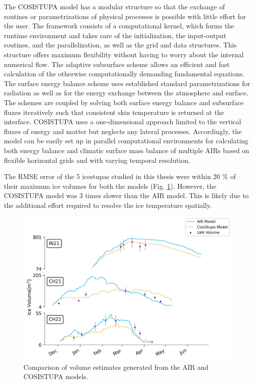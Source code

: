 The COSISTUPA model has a modular structure so that the exchange of routines or parametrizations of physical
processes is possible with little effort for the user. The framework consists of a computational kernel, which
forms the runtime environment and takes care of the initialization, the input-output routines, and the
parallelization, as well as the grid and data structures. This structure offers maximum flexibility without
having to worry about the internal numerical flow. The adaptive subsurface scheme allows an efficient and fast
calculation of the otherwise computationally demanding fundamental equations. The surface energy balance scheme
uses established standard parametrizations for radiation as well as for the energy exchange between the
atmosphere and surface. The schemes are coupled by solving both surface energy balance and subsurface fluxes
iteratively such that consistent skin temperature is returned at the interface. COSISTUPA uses a one-dimensional
approach limited to the vertical fluxes of energy and matter but neglects any lateral processes. Accordingly,
the model can be easily set up in parallel computational environments for calculating both energy balance and
climatic surface mass balance of multiple \ac{AIRs} based on flexible horizontal grids and with varying temporal
resolution.

The RMSE error of the 5 icestupas studied in this thesis were within 20 \% of their maximum ice volumes for both
the models (Fig. \ref{fig:Cosistupa}). However, the COSISTUPA model was 3 times slower than the AIR model. This
is likely due to the additional effort required to resolve the ice temperature spatially.


\begin{figure}[t]
\centering
\includegraphics[width=\textwidth]{figs/model_compare.jpg}

\caption{Comparison of volume estimates generated from the AIR and COSISTUPA models.}

\label{fig:Cosistupa}
\end{figure}






